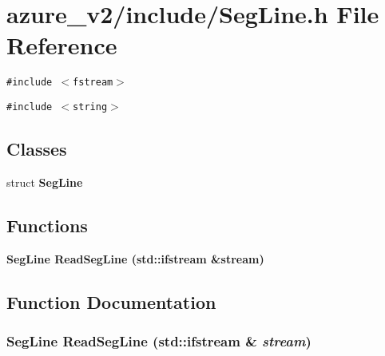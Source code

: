 \section{azure\_\-v2/include/Seg\-Line.h File Reference}
\label{SegLine_8h}
{\tt \#include $<$fstream$>$}\par
{\tt \#include $<$string$>$}\par
\subsection*{Classes}
\begin{CompactItemize}
\item 
struct \bf{Seg\-Line}
\end{CompactItemize}
\subsection*{Functions}
\begin{CompactItemize}
\item 
\bf{Seg\-Line} \bf{Read\-Seg\-Line} (std::ifstream \&stream)
\end{CompactItemize}


\subsection{Function Documentation}
\subsubsection{\setlength{\rightskip}{0pt plus 5cm}\bf{Seg\-Line} Read\-Seg\-Line (std::ifstream \& {\em stream})}\label{SegLine_8h_d3da8919b1dffe274e1110877104a535}


